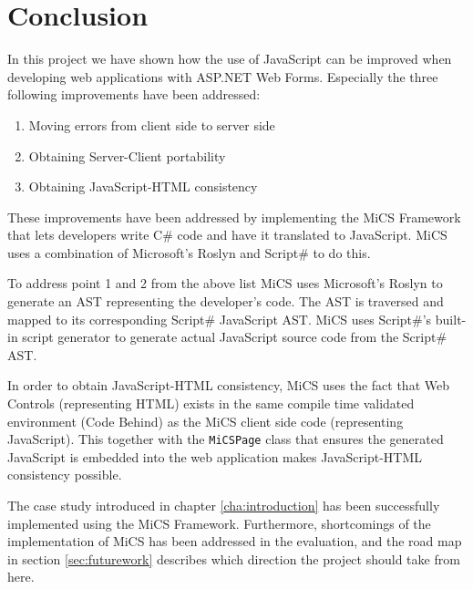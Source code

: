 \chapter{Conclusion}
In this project we have shown how the use of JavaScript can be improved when developing web applications with ASP.NET Web Forms. Especially the three following improvements have been addressed:

\begin{enumerate}
	\item Moving errors from client side to server side
	\item Obtaining Server-Client portability
	\item Obtaining JavaScript-HTML consistency
\end{enumerate}

These improvements have been addressed by implementing the MiCS Framework that lets developers write C\# code and have it translated to JavaScript. MiCS uses a combination of Microsoft's Roslyn and Script\# to do this. 

To address point 1 and 2 from the above list MiCS uses Microsoft's Roslyn to generate an AST representing the developer's code. The AST is traversed and mapped to its corresponding Script\# JavaScript AST. MiCS uses Script\#'s built-in script generator to generate actual JavaScript source code from the Script\# AST. 

In order to obtain JavaScript-HTML consistency, MiCS uses the fact that Web Controls (representing HTML) exists in the same compile time validated environment (Code Behind) as the MiCS client side code (representing JavaScript). This together with the \texttt{MiCSPage} class that ensures the generated JavaScript is embedded into the web application makes JavaScript-HTML consistency possible.

The case study introduced in chapter \ref{cha:introduction} has been successfully implemented using the MiCS Framework. Furthermore, shortcomings of the implementation of MiCS has been addressed in the evaluation, and the road map in section \ref{sec:futurework} describes which direction the project should take from here.
